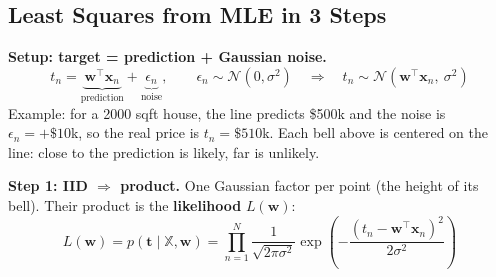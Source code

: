 \begin{keeptogether}
{
\par}
\end{keeptogether}

\subsection*{Least Squares from MLE in 3 Steps}
\begin{keeptogether}
\textbf{Setup: target = prediction + Gaussian noise.}
\[
t_n = \underbrace{\mathbf{w}^\top\mathbf{x}_n}_{\text{prediction}} + \underbrace{\epsilon_n}_{\text{noise}},
\qquad \epsilon_n \sim \mathcal{N}(0, \sigma^2)
\quad\Rightarrow\quad
t_n \sim \mathcal{N}(\mathbf{w}^\top\mathbf{x}_n,\ \sigma^2)
\]
Example: for a 2000 sqft house, the line predicts \$500k and the noise is $\epsilon_n = +\$10$k, so the real price is $t_n = \$510$k. Each bell above is centered on the line: close to the prediction is likely, far is unlikely.
\end{keeptogether}

\begin{keeptogether}
\textbf{Step 1: IID $\Rightarrow$ product.} One Gaussian factor per point (the height of its bell). Their product is the \textbf{likelihood} $L(\mathbf{w})$:
\[
L(\mathbf{w}) = p(\mathbf{t} \mid \mathbb{X}, \mathbf{w}) = \prod_{n=1}^{N} \frac{1}{\sqrt{2\pi\sigma^2}} \exp\!\left(-\frac{(t_n - \mathbf{w}^\top\mathbf{x}_n)^2}{2\sigma^2}\right)
\]
\end{keeptogether}

